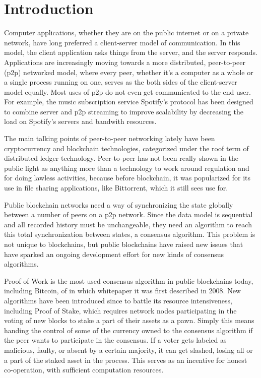 \chapter{Introduction}
\label{Introduction}

Computer applications, whether they are on the public internet or on a private network, have long preferred a client-server model of communication. In this model, the client application asks things from the server, and the server responds. Applications are increasingly moving towards a more distributed, peer-to-peer (p2p) networked model, where every peer, whether it's a computer as a whole or a single process running on one, serves as the both sides of the client-server model equally. Most uses of p2p do not even get communicated to the end user. For example, the music subscription service Spotify's protocol has been designed to combine server and p2p streaming to improve scalability by decreasing the load on Spotify's servers and bandwith resources.\cite{Kreitz_undated-yp} 

The main talking points of peer-to-peer networking lately have been cryptocurrency and blockchain technologies, categorized under the roof term of distributed ledger technology. Peer-to-peer has not been really shown in the public light as anything more than a technology to work around regulation and for doing lawless activities, because before blockchain, it was popularized for its use in file sharing applications, like Bittorrent, which it still sees use for. 

Public blockchain networks need a way of synchronizing the state globally between a number of peers on a p2p network. Since the data model is sequential and all recorded history must be unchangeable, they need an algorithm to reach this total synchronization between states, a consensus algorithm. This problem is not unique to blockchains, but public blockchains have raised new issues that have sparked an ongoing development effort for new kinds of consensus algorithms.

Proof of Work is the most used consensus algorithm in public blockchains today, including Bitcoin, of in which whitepaper it was first described in 2008.\cite{Nakamoto2019-ax} New algorithms have been introduced since to battle its resource intensiveness, including Proof of Stake, which requires network nodes participating in the voting of new blocks to stake a part of their assets as a pawn. Simply this means handing the control of some of the currency owned to the consensus algorithm if the peer wants to participate in the consensus. If a voter gets labeled as malicious, faulty, or absent by a certain majority, it can get slashed, losing all or a part of the staked asset in the process. This serves as an incentive for honest co-operation, with sufficient computation resources.

